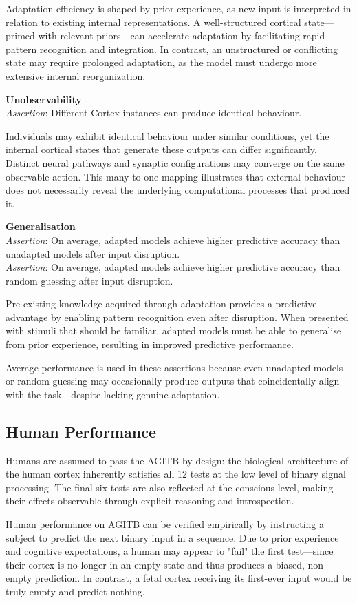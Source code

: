 \documentclass{article}
\newcommand{\agitbtest}[2]{
 \item \textbf{#1} \\
 #2
}
\begin{document}
\begin{agitblist}
{Adaptation efficiency is shaped by prior experience, as new input is interpreted in relation to existing internal representations. A well-structured cortical state—primed with relevant priors—can accelerate adaptation by facilitating rapid pattern recognition and integration. In contrast, an unstructured or conflicting state may require prolonged adaptation, as the model must undergo more extensive internal reorganization.
}
\agitbtest{Unobservability}{
\emph{Assertion}: Different Cortex instances can produce identical behaviour.

Individuals may exhibit identical behaviour under similar conditions, yet the internal cortical states that generate these outputs can differ significantly. Distinct neural pathways and synaptic configurations may converge on the same observable action. This many-to-one mapping illustrates that external behaviour does not necessarily reveal the underlying computational processes that produced it.
}
\agitbtest{Generalisation}{
\emph{Assertion}: On average, adapted models achieve higher predictive accuracy than unadapted models after input disruption.\\
\emph{Assertion}: On average, adapted models achieve higher predictive accuracy than random guessing after input disruption.

Pre-existing knowledge acquired through adaptation provides a predictive advantage by enabling pattern recognition even after disruption. When presented with stimuli that should be familiar, adapted models must be able to generalise from prior experience, resulting in improved predictive performance.

Average performance is used in these assertions because even unadapted models or random guessing may occasionally produce outputs that coincidentally align with the task—despite lacking genuine adaptation.
}

\end{agitblist}

\subsection{Human Performance}
Humans are assumed to pass the AGITB by design: the biological architecture of the human cortex inherently satisfies all 12 tests at the low level of binary signal processing. The final six tests are also reflected at the conscious level, making their effects observable through explicit reasoning and introspection.

Human performance on AGITB can be verified empirically by instructing a subject to predict the next binary input in a sequence. Due to prior experience and cognitive expectations, a human may appear to "fail" the first test—since their cortex is no longer in an empty state and thus produces a biased, non-empty prediction. In contrast, a fetal cortex receiving its first-ever input would be truly empty and predict nothing.
\end{document}
